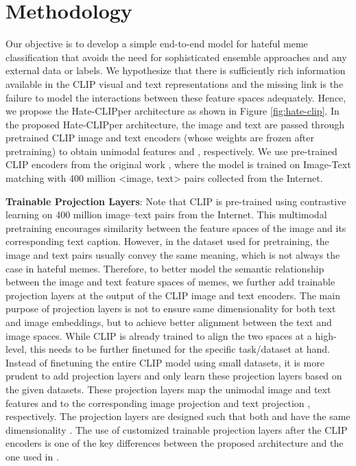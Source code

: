 \documentclass[11pt]{article}
\begin{document}
\section{Methodology}


Our objective is to develop a simple end-to-end model for hateful meme classification that avoids the need for sophisticated ensemble approaches and any external data or labels. We hypothesize that there is sufficiently rich information available in the CLIP visual and text representations and the missing link is the failure to model the interactions between these feature spaces adequately.  Hence, we propose the Hate-CLIPper architecture as shown in Figure \ref{fig:hate-clip}. In the proposed Hate-CLIPper architecture, the image  and text  are passed through pretrained CLIP image and text encoders (whose weights are frozen after pretraining) to obtain unimodal features  and , respectively. We use pre-trained CLIP encoders from the original work \cite{radford2021learning}, where the model is trained on Image-Text matching with 400 million <image, text> pairs collected from the Internet.

\noindent \textbf{Trainable Projection Layers}: Note that CLIP
is pre-trained using contrastive learning on 400 million image–text pairs from the Internet. This multimodal pretraining encourages similarity between the feature spaces of the image and its corresponding text caption. However, in the dataset used for pretraining, the image and text pairs usually convey the same meaning, which is not always the case in hateful memes. Therefore, to better model the semantic relationship  between the image and text feature spaces of memes, we further add trainable projection layers at the output of the CLIP image and text encoders. The main purpose of projection layers is not to ensure same dimensionality for both text and image embeddings, but to achieve better alignment between the text and image spaces. While CLIP is already trained to align the two spaces at a high-level, this needs to be further finetuned for the specific task/dataset at hand. Instead of finetuning the entire CLIP model using small datasets, it is more prudent to add projection layers and only learn these projection layers based on the given datasets. These projection layers map the unimodal image and text features  and  to the corresponding image projection  and text projection , respectively. The projection layers are designed such that both  and  have the same dimensionality . The use of customized trainable projection layers after the CLIP encoders is one of the key differences between the proposed architecture and the one used in \cite{zia-etal-2021-racist}.
\end{document}
